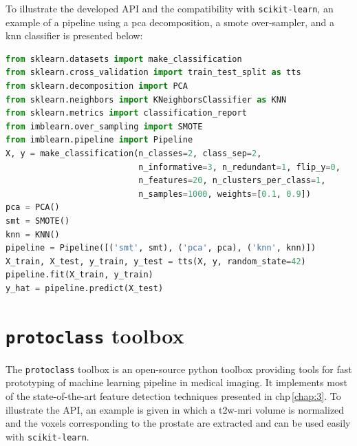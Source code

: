 To illustrate the developed API and the compatibility with \texttt{scikit-learn}, an example of a pipeline using a \ac{pca} decomposition, a \ac{smote} over-sampler, and a \ac{knn} classifier is presented below:

\begin{lstlisting}[language=Python, caption=Code snippet to over-sample a dataset using \acs*{smote} in conjunction with \ac{pca} and a \ac{knn} classifer.]
from sklearn.datasets import make_classification
from sklearn.cross_validation import train_test_split as tts
from sklearn.decomposition import PCA
from sklearn.neighbors import KNeighborsClassifier as KNN
from sklearn.metrics import classification_report
from imblearn.over_sampling import SMOTE
from imblearn.pipeline import Pipeline
X, y = make_classification(n_classes=2, class_sep=2,
                           n_informative=3, n_redundant=1, flip_y=0,
                           n_features=20, n_clusters_per_class=1,
                           n_samples=1000, weights=[0.1, 0.9])
pca = PCA()
smt = SMOTE()
knn = KNN()
pipeline = Pipeline([('smt', smt), ('pca', pca), ('knn', knn)])
X_train, X_test, y_train, y_test = tts(X, y, random_state=42)
pipeline.fit(X_train, y_train)
y_hat = pipeline.predict(X_test)
\end{lstlisting}

\section{\texttt{protoclass} toolbox}\label{chp4:sec:protoclass}

The \texttt{protoclass} toolbox is an open-source python toolbox providing tools for fast prototyping of machine learning pipeline in medical imaging.
It implements most of the state-of-the-art feature detection techniques presented in \acs{chp}\,\ref{chap:3}.
To illustrate the API, an example is given in which a \ac{t2w}-\ac{mri} volume is normalized and the voxels corresponding to the prostate are extracted and can be used easily with \texttt{scikit-learn}.

